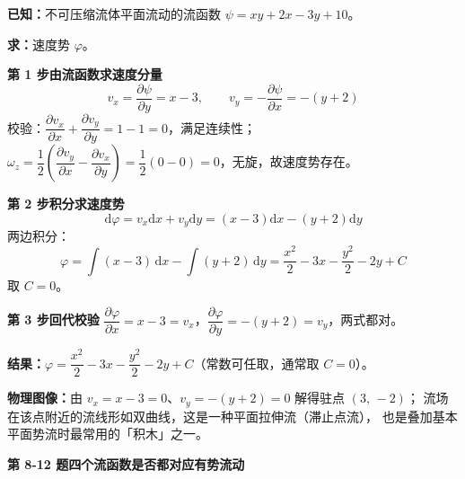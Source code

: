 \begin{jie}
\textbf{已知：}不可压缩流体平面流动的流函数 $\psi=xy+2x-3y+10$。

\textbf{求：}速度势 $\varphi$。

\textbf{第 1 步\quad 由流函数求速度分量}
\[ v_x=\frac{\partial\psi}{\partial y}=x-3,\qquad v_y=-\frac{\partial\psi}{\partial x}=-(y+2) \]
校验：$\dfrac{\partial v_x}{\partial x}+\dfrac{\partial v_y}{\partial y}=1-1=0$，满足连续性；
$\omega_z=\dfrac{1}{2}\left(\dfrac{\partial v_y}{\partial x}-\dfrac{\partial v_x}{\partial y}\right)
=\dfrac{1}{2}(0-0)=0$，无旋，故速度势存在。

\textbf{第 2 步\quad 积分求速度势}
\[ \mathrm{d}\varphi=v_x\mathrm{d}x+v_y\mathrm{d}y=(x-3)\mathrm{d}x-(y+2)\mathrm{d}y \]
两边积分：
\[ \varphi=\int(x-3)\,\mathrm{d}x-\int(y+2)\,\mathrm{d}y
 =\frac{x^2}{2}-3x-\frac{y^2}{2}-2y+C \]
取 $C=0$。

\textbf{第 3 步\quad 回代校验}
$\dfrac{\partial\varphi}{\partial x}=x-3=v_x$，$\dfrac{\partial\varphi}{\partial y}=-(y+2)=v_y$，两式都对。

\textbf{结果：}$\varphi=\dfrac{x^2}{2}-3x-\dfrac{y^2}{2}-2y+C$（常数可任取，通常取 $C=0$）。

\textbf{物理图像：}由 $v_x=x-3=0$、$v_y=-(y+2)=0$ 解得驻点 $(3,\,-2)$；
流场在该点附近的流线形如双曲线，这是一种平面拉伸流（滞止点流），
也是叠加基本平面势流时最常用的「积木」之一。
\end{jie}

\noindent\textbf{第 8-12 题\quad 四个流函数是否都对应有势流动}

